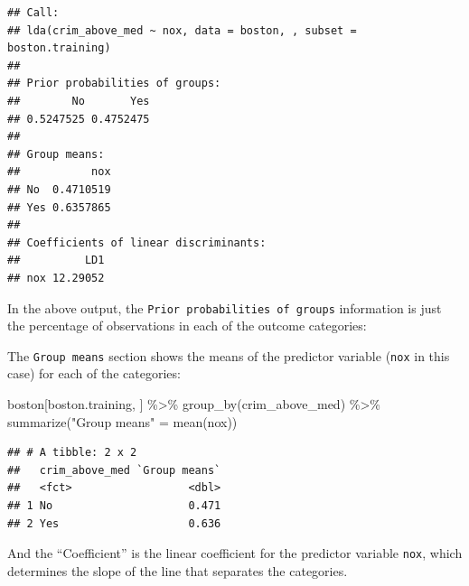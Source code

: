 \documentclass[
]{book}
\newenvironment{Shaded}{\begin{snugshade}}{\end{snugshade}}
\newcommand{\DecValTok}[1]{\textcolor[rgb]{0.00,0.00,0.81}{#1}}
\newcommand{\FloatTok}[1]{\textcolor[rgb]{0.00,0.00,0.81}{#1}}
\newcommand{\FunctionTok}[1]{\textcolor[rgb]{0.00,0.00,0.00}{#1}}
\newcommand{\NormalTok}[1]{#1}
\newcommand{\OtherTok}[1]{\textcolor[rgb]{0.56,0.35,0.01}{#1}}
\newcommand{\SpecialCharTok}[1]{\textcolor[rgb]{0.00,0.00,0.00}{#1}}
\newcommand{\StringTok}[1]{\textcolor[rgb]{0.31,0.60,0.02}{#1}}
\begin{document}
\begin{verbatim}
## Call:
## lda(crim_above_med ~ nox, data = boston, , subset = boston.training)
## 
## Prior probabilities of groups:
##        No       Yes 
## 0.5247525 0.4752475 
## 
## Group means:
##           nox
## No  0.4710519
## Yes 0.6357865
## 
## Coefficients of linear discriminants:
##          LD1
## nox 12.29052
\end{verbatim}

In the above output, the \texttt{Prior\ probabilities\ of\ groups} information is just the percentage of observations in each of the outcome categories:

\begin{Shaded}
\end{Shaded}

The \texttt{Group\ means} section shows the means of the predictor variable (\texttt{nox} in this case) for each of the categories:

\begin{Shaded}
\begin{Highlighting}[]
\NormalTok{boston[boston.training, ] }\SpecialCharTok{\%\textgreater{}\%}
  \FunctionTok{group\_by}\NormalTok{(crim\_above\_med) }\SpecialCharTok{\%\textgreater{}\%}
  \FunctionTok{summarize}\NormalTok{(}\StringTok{"Group means"} \OtherTok{=} \FunctionTok{mean}\NormalTok{(nox))}
\end{Highlighting}
\end{Shaded}

\begin{verbatim}
## # A tibble: 2 x 2
##   crim_above_med `Group means`
##   <fct>                  <dbl>
## 1 No                     0.471
## 2 Yes                    0.636
\end{verbatim}

And the ``Coefficient'' is the linear coefficient for the predictor variable \texttt{nox}, which determines the slope of the line that separates the categories.
\end{document}
